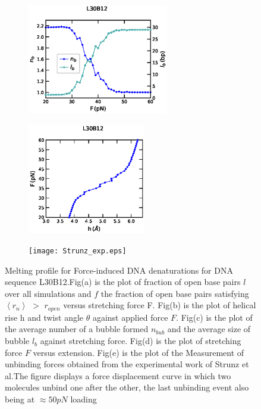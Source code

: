 \documentclass[12pt,masters,final]{UTRGVthesis}
\begin{document}
\begin{figure}[!h]
        \begin{subfigure}[b]{0.49\textwidth}
                \centering
                \includegraphics[scale=0.35,height=1.9in, width=.8\textwidth]{L30B12_Strunz_force_bub.eps}
                \caption{}
                \label{fig:L30B12bub}
        \end{subfigure}%
        \hspace{-0.5cm}
        \begin{subfigure}[b]{0.49\textwidth}
                \centering
                \includegraphics[scale=0.35,height=1.9in, width=.8\textwidth]{L30B12_Strunz_force_extension.eps}
                \caption{}
                \label{fig:L30B12extension}
        \end{subfigure}%
        
        \begin{subfigure}[b]{0.49\textwidth}
                \centering
                \texttt{[image: Strunz\_exp.eps]}
                \caption{}
                \label{fig:L30B12exp}
        \end{subfigure}%
       
\caption{\small Melting profile for Force-induced DNA denaturations for DNA sequence L30B12.Fig(a) is the plot of fraction of open base pairs $l$ over all simulations and $f$ the fraction of open base pairs satisfying $\left<r_n\right>$ $>$ $r_{open}$ versus stretching force F. Fig(b) is the plot of helical rise h and twist angle $\theta$ against applied force $F$. Fig(c) is the plot of the average number of a bubble formed  $n_{bub}$ and the average size of bubble $l_b$ against stretching force. Fig(d) is the plot of stretching force $F$ versus extension. Fig(e) is the plot of the Measurement of unbinding forces obtained from the experimental work of Strunz et al.The figure displays a force displacement curve in which  two molecules unbind one after the other, the last unbinding event also being at $\approx 50pN$ loading }
\label{fig:L30B12}    

\end{figure}
\newpage
\end{document}
